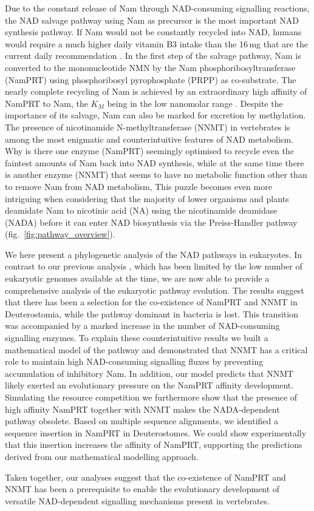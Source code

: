 Due to the constant release of Nam through NAD-consuming signalling reactions, the NAD salvage pathway using Nam as precursor is the most important NAD synthesis pathway. If Nam would not be constantly recycled into NAD, humans would require a much higher daily vitamin B3 intake than the 16\,mg that are the current daily recommendation \cite{CommissionofEuropeanCommunities2008}. In the first step of the salvage pathway, Nam is converted to the mononucleotide NMN by the Nam phosphoribosyltransferase (NamPRT) using phosphoribosyl pyrophosphate (PRPP) as co-substrate. The nearly complete recycling of Nam is achieved by an extraordinary high affinity of NamPRT to Nam, the $K_{M}$ being in the low nanomolar range \cite{Burgos2008}. Despite the importance of its salvage, Nam can also be marked for excretion by methylation. The presence of nicotinamide N-methyltransferase (NNMT) in vertebrates \cite{Gossmann2012FEBS} is among the most enigmatic and counterintuitive features of NAD metabolism. Why is there one enzyme (NamPRT) seemingly optimised to recycle even the faintest amounts of Nam back into NAD synthesis, while at the same time there is another enzyme (NNMT) that seems to have no metabolic function other than to remove Nam from NAD metabolism, This puzzle becomes even more intriguing when considering that the majority of lower organisms and plants deamidate Nam to nicotinic acid (NA) using the nicotinamide deamidase (NADA) before it can enter NAD biosynthesis via the Preiss-Handler pathway (fig.~\ref{fig:pathway_overview}).

We here present a phylogenetic analysis of the NAD pathways in eukaryotes. In contrast to our previous analysis \cite{Gossmann2012FEBS}, which has been limited by the low number of eukaryotic genomes available at the time, we are now able to provide a comprehensive analysis of the eukaryotic pathway evolution. The results suggest that there has been a selection for the co-existence of NamPRT and NNMT in Deuterostomia, while the pathway dominant in bacteria is lost. This transition was accompanied by a marked increase in the number of NAD-consuming signalling enzymes. To explain these counterintuitive results we built a mathematical model of the pathway and demonstrated that NNMT has a critical role to maintain high NAD-consuming signalling fluxes by preventing accumulation of inhibitory Nam. In addition, our model predicts that NNMT likely exerted an evolutionary pressure on the NamPRT affinity development. Simulating the resource competition we furthermore show that the presence of high affinity NamPRT together with NNMT makes the NADA-dependent pathway obsolete. Based on multiple sequence alignments, we identified a sequence insertion in NamPRT in Deuterostomes. We could show experimentally that this insertion increases the affinity of NamPRT, supporting the predictions derived from our mathematical modelling approach.

Taken together, our analyses suggest that the co-existence of NamPRT and NNMT has been a prerequisite to enable the evolutionary development of versatile NAD-dependent signalling mechanisms present in vertebrates.
